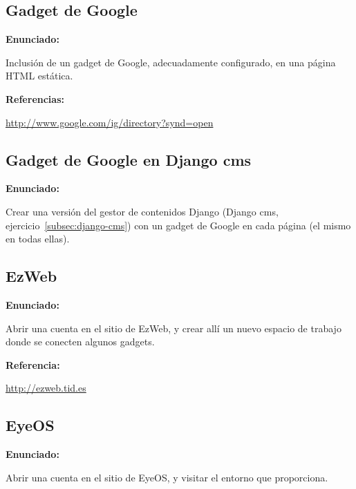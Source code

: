 \subsection{Gadget de Google}
\label{subsec:gadget-google}

\textbf{Enunciado:}

Inclusión de un gadget de Google, adecuadamente configurado, en una página HTML estática.

\textbf{Referencias:}

\url{http://www.google.com/ig/directory?synd=open}

\subsection{Gadget de Google en Django cms}
\label{subsec:gadget-google-cms}

\textbf{Enunciado:}

Crear una versión del gestor de contenidos Django (Django cms, ejercicio~\ref{subsec:django-cms}) con un gadget de Google en cada página (el mismo en todas ellas).

\subsection{EzWeb}
\label{subsec:ezweb}

\textbf{Enunciado:}

Abrir una cuenta en el sitio de EzWeb, y crear allí un nuevo espacio de trabajo donde se conecten algunos gadgets.

\textbf{Referencia:}

\url{http://ezweb.tid.es}

\subsection{EyeOS}
\label{subsec:eyeos}

\textbf{Enunciado:}

Abrir una cuenta en el sitio de EyeOS, y visitar el entorno que proporciona.

